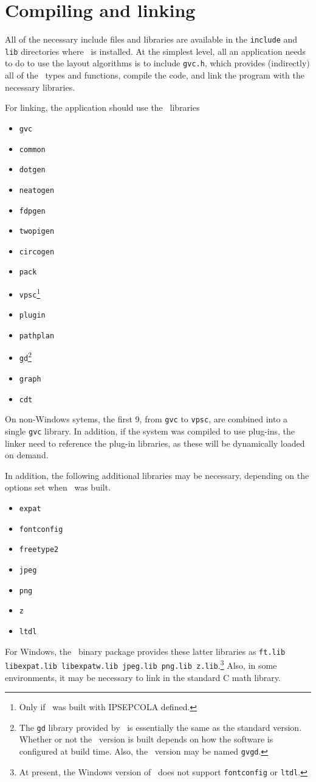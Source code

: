 \section{Compiling and linking}
\label{sec:build}
All of the necessary include files and libraries are available
in the {\tt include} and {\tt lib} directories where \gviz\
is installed. At the simplest level, all an application needs
to do to use the layout algorithms is to include {\tt gvc.h},
which provides (indirectly) all of the \gviz\ types and functions,
compile the code,
and link the program with the necessary libraries.

For linking, the application should use the \gviz\ libraries 
\begin{itemize}
\item {\tt gvc}
\item {\tt common}
\item {\tt dotgen}
\item {\tt neatogen}
\item {\tt fdpgen}
\item {\tt twopigen}
\item {\tt circogen}
\item {\tt pack}
\item {\tt vpsc}\footnote{
Only if \gviz\ was built with IPSEPCOLA defined.}
\item {\tt plugin}
\item {\tt pathplan}
\item {\tt gd}\footnote{
The {\tt gd} library provided by \gviz\ is essentially
the same as the standard version. Whether or not the \gviz\ version is built
depends on how the software is configured at build time. Also, the \gviz\
version may be named {\tt gvgd}.
}
\item {\tt graph}
\item {\tt cdt}
\end{itemize}
On non-Windows sytems, the first 9, from {\tt gvc} to {\tt vpsc},
are combined into a single {\tt gvc} library. In addition, if the
system was compiled to use plug-ins, the linker need to reference
the plug-in libraries, as these will be dynamically loaded on demand. 

In addition, the following additional libraries may be necessary, depending
on the options set when \gviz\ was built.
\begin{itemize}
\item {\tt expat}
\item {\tt fontconfig}
\item {\tt freetype2}
\item {\tt jpeg}
\item {\tt png}
\item {\tt z}
\item {\tt ltdl}
\end{itemize}
For Windows, the \gviz\ binary package provides these latter libraries as
{\tt ft.lib libexpat.lib libexpatw.lib jpeg.lib png.lib z.lib}.\footnote{
At present, the Windows version of \gviz\ does not support {\tt fontconfig}
or {\tt ltdl}.}
Also, in some environments, it may be necessary to link
in the standard C math library.

